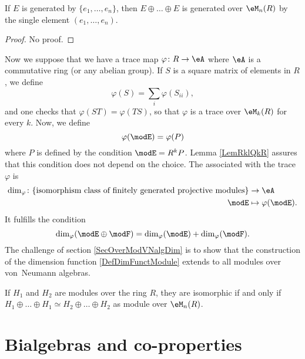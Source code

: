 \begin{lemma}		\label{LemFGenEEEsingleGen}
If $E$ is generated by $\{ e_1,\ldots, e_n \}$, then $E\oplus\ldots\oplus E$ is generated over $\eM_n(R)$ by the single element $(e_1,\ldots,e_n)$.
\end{lemma}
\begin{proof}
No proof.
\end{proof}


Now we suppose that we have a trace map $\varphi\colon R\to \eA$ where $\eA$ is a commutative ring (or any abelian group). If $S$ is a square matrix of elements in $R$, we define
\begin{equation}
	\varphi(S)=\sum_i\varphi(S_{ii}),
\end{equation}
and one checks that $\varphi(ST)=\varphi(TS)$, so that $\varphi$ is a trace over $\eM_k(R)$ for every $k$. Now, we define 
\begin{equation}			\label{EqPreDefDimModuleRA}
	\varphi(\modE)=\varphi(P)		
\end{equation}
where $P$ is defined by the condition $\modE=R^kP$. Lemma \ref{LemRklQkR} assures that this condition does not depend on the choice. The  associated with the trace $\varphi$ is
\begin{equation}\label{DefDimFunctModule}
\begin{aligned}
	\dim_{\varphi}\colon \{ \text{isomorphism class of finitely generated projective modules} \} &\to \eA\\
   	\modE&\mapsto \varphi(\modE).
\end{aligned}
\end{equation}
It fulfills the condition
\[ 
	\dim_{\varphi}(\modE\oplus \modF)=\dim_{\varphi}(\modE)+\dim_{\varphi}(\modF).
\]
The challenge of section \ref{SecOverModVNalgDim} is to show that the construction of the dimension function \eqref{DefDimFunctModule} extends to all modules over von~Neumann algebras. 

\begin{lemma}
If $H_1$ and $H_2$ are modules over the ring $R$, they are isomorphic if and only if $H_1\oplus\ldots\oplus H_1\simeq H_2\oplus\ldots\oplus H_2$ as module over $\eM_n(R)$.
\end{lemma}


\section{Bialgebras and co-properties}

